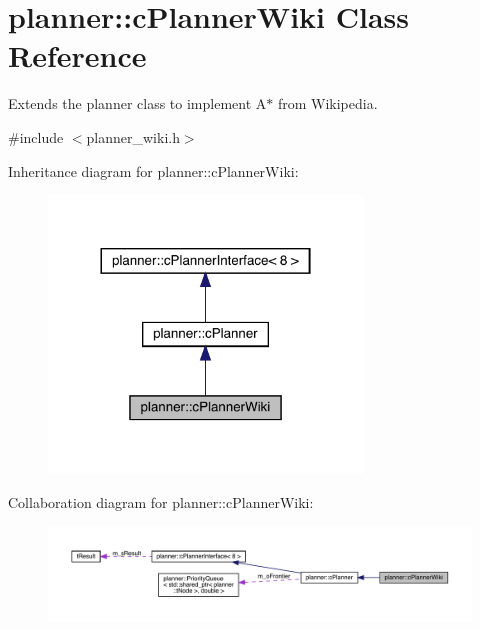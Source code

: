 \hypertarget{classplanner_1_1c_planner_wiki}{}\section{planner\+:\+:c\+Planner\+Wiki Class Reference}
\label{classplanner_1_1c_planner_wiki}


Extends the planner class to implement A$\ast$ from Wikipedia.  




{\ttfamily \#include $<$planner\+\_\+wiki.\+h$>$}



Inheritance diagram for planner\+:\+:c\+Planner\+Wiki\+:
\nopagebreak
\begin{figure}[H]
\begin{center}
\leavevmode
\includegraphics[width=236pt]{classplanner_1_1c_planner_wiki__inherit__graph}
\end{center}
\end{figure}


Collaboration diagram for planner\+:\+:c\+Planner\+Wiki\+:
\nopagebreak
\begin{figure}[H]
\begin{center}
\leavevmode
\includegraphics[width=350pt]{classplanner_1_1c_planner_wiki__coll__graph}
\end{center}
\end{figure}
